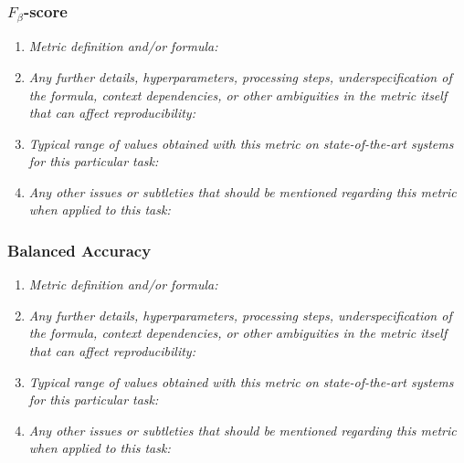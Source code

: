 \documentclass[a4paper,11pt]{article}
\begin{document}
        \subsubsection{$F_\beta$-score}
            \begin{enumerate}[label=\alph*.]
                \item \textit{Metric definition and/or formula:}
                \bigskip
                \item \textit{Any further details, hyperparameters, processing steps, underspecification of the formula, context dependencies, or other ambiguities in the metric itself that can affect reproducibility:}
                \bigskip
                \item \textit{Typical range of values obtained with this metric on state-of-the-art systems for this particular task:}
                \bigskip
                \item \textit{Any other issues or subtleties that should be mentioned regarding this metric when applied to this task:}
                \bigskip
            \end{enumerate}
        \subsubsection{Balanced Accuracy}
            \begin{enumerate}[label=\alph*.]
                \item \textit{Metric definition and/or formula:}
                \bigskip
                \item \textit{Any further details, hyperparameters, processing steps, underspecification of the formula, context dependencies, or other ambiguities in the metric itself that can affect reproducibility:}
                \bigskip
                \item \textit{Typical range of values obtained with this metric on state-of-the-art systems for this particular task:}
                \bigskip
                \item \textit{Any other issues or subtleties that should be mentioned regarding this metric when applied to this task:}
                \bigskip
            \end{enumerate}
\end{document}
